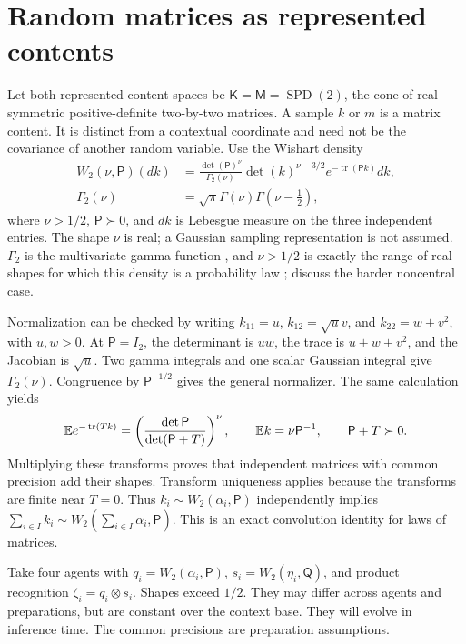 \section{Random matrices as represented contents}
\label{cf:laws}

Let both represented-content spaces be $\mathsf K=\mathsf M=\operatorname{SPD}(2)$, the cone of real symmetric positive-definite two-by-two matrices. A sample $k$ or $m$ is a matrix content. It is distinct from a contextual coordinate and need not be the covariance of another random variable. Use the Wishart density
\begin{equation}
 \begin{aligned}
 W_2(\nu,\mathsf P)(dk)
 &=\frac{\det(\mathsf P)^\nu}{\Gamma_2(\nu)}
 \det(k)^{\nu-3/2}e^{-\operatorname{tr}(\mathsf Pk)}dk,\\
 \Gamma_2(\nu)&=\sqrt\pi\Gamma(\nu)\Gamma(\nu-\tfrac12),
 \end{aligned}
 \label{cf:wishart}
\end{equation}
where $\nu>1/2$, $\mathsf P\succ0$, and $dk$ is Lebesgue measure on the three independent entries. The shape $\nu$ is real; a Gaussian sampling representation is not assumed. $\Gamma_2$ is the multivariate gamma function \citep{Muirhead1982}, and $\nu>1/2$ is exactly the range of real shapes for which this density is a probability law \citep{Gindikin1975}; \citet{LetacMassam2017} discuss the harder noncentral case.

Normalization can be checked by writing $k_{11}=u$, $k_{12}=\sqrt u v$, and $k_{22}=w+v^2$, with $u,w>0$. At $\mathsf P=I_2$, the determinant is $uw$, the trace is $u+w+v^2$, and the Jacobian is $\sqrt u$. Two gamma integrals and one scalar Gaussian integral give $\Gamma_2(\nu)$. Congruence by $\mathsf P^{-1/2}$ gives the general normalizer. The same calculation yields
\begin{equation}
 \mathbb E e^{-\operatorname{tr}(Tk)}
 =\left(\frac{\det\mathsf P}{\det(\mathsf P+T)}\right)^\nu,
 \qquad
 \mathbb E k=\nu\mathsf P^{-1},
 \qquad \mathsf P+T\succ0.
 \label{cf:laplace}
\end{equation}
Multiplying these transforms proves that independent matrices with common precision add their shapes. Transform uniqueness applies because the transforms are finite near $T=0$. Thus $k_i\sim W_2(\alpha_i,\mathsf P)$ independently implies $\sum_{i\in I}k_i\sim W_2(\sum_{i\in I}\alpha_i,\mathsf P)$. This is an exact convolution identity for laws of matrices.

Take four agents with $q_i=W_2(\alpha_i,\mathsf P)$, $s_i=W_2(\eta_i,\mathsf Q)$, and product recognition $\zeta_i=q_i\otimes s_i$. Shapes exceed $1/2$. They may differ across agents and preparations, but are constant over the context base. They will evolve in inference time. The common precisions are preparation assumptions.

